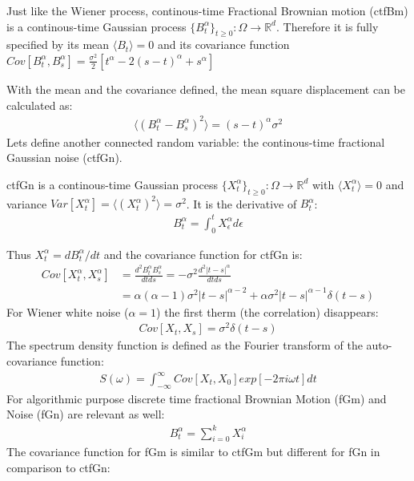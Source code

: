 \documentclass[
  a4paper,BCOR10mm,oneside,
  bibtotoc,idxtotoc,
  headsepline,footsepline,%
  fleqn,openbib
]{scrbook}
\begin{document}
\begin{mydef}
Just like the Wiener process, continous-time Fractional Brownian motion (ctfBm) is a continous-time Gaussian process $\{B^{\alpha}_t\}_{t\geq0}: \Omega \rightarrow \mathbb{R}^d$. Therefore it is fully specified by its mean $\langle B_t \rangle=0$ and its covariance function $Cov[B^{\alpha}_t,B^{\alpha}_s]=\frac{\sigma^2}{2}[t^{\alpha}-2(s-t)^{\alpha}+s^{\alpha}]$
\end{mydef}
With the mean and the covariance defined, the mean square displacement can be calculated as: 
\begin{align}
\label{MSDfbm}
 \langle (B^{\alpha}_{t}-B^{\alpha}_{s})^2 \rangle = (s-t)^\alpha \sigma^2
\end{align}
Lets define another connected random variable: the continous-time fractional Gaussian noise (ctfGn).
\begin{mydef}
ctfGn is a continous-time Gaussian process $\{X^{\alpha}_t\}_{t\geq0}: \Omega \rightarrow \mathbb{R}^d$ with $\langle X^{\alpha}_t \rangle=0$ and variance $Var[X^{\alpha}_t]= \langle (X^{\alpha}_t)^2 \rangle=\sigma^2$. It is the derivative of $B^{\alpha}_t$:
\begin{align}
  B^{\alpha}_t=\int^t_0 X^{\alpha}_{\epsilon} d \epsilon
\end{align}
\end{mydef}
Thus $X^{\alpha}_t=d B^{\alpha}_t/dt$ and the covariance function for ctfGn is:
\begin{align}
 Cov[X^{\alpha}_t,X^{\alpha}_s]&= \frac{d^2 B^{\alpha}_t B^{\alpha}_s}{dt ds}=-\sigma^2 \frac{d^2 |t-s|^{\alpha}}{dtds}\\
 &=\alpha (\alpha-1) \sigma^2 |t-s|^{\alpha-2}+\alpha \sigma^2 |t-s|^{\alpha-1} \delta(t-s)
\end{align}
For Wiener white noise ($\alpha=1$) the first therm (the correlation) disappears:
\begin{align}
 Cov[X_t,X_s]= \sigma^2 \delta(t-s)
\end{align}
The spectrum density function is defined as the Fourier transform of the auto-covariance function:
\begin{align}
 S(\omega)= \int^{\infty}_{-\infty} Cov[X_t,X_0] exp[-2 \pi i \omega t] dt
\end{align}
For algorithmic purpose discrete time fractional Brownian Motion  (fGm) and Noise (fGn) are relevant as well:
\begin{align}
B^{\alpha}_{t}= \sum_{i=0}^kX^{\alpha}_i
\end{align}
The covariance function for fGm is similar to ctfGm but different for fGn in comparison to ctfGn:
\end{document}
